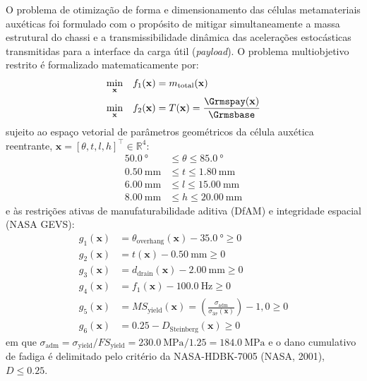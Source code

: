O problema de otimização de forma e dimensionamento das células metamateriais auxéticas foi formulado com o propósito de mitigar simultaneamente a massa estrutural do chassi e a transmissibilidade dinâmica das acelerações estocásticas transmitidas para a interface da carga útil (\textit{payload}). O problema multiobjetivo restrito é formalizado matematicamente por:
\begin{equation}
  \begin{aligned}
    \min_{\mathbf{x}} \quad & f_1(\mathbf{x}) = m_{\text{total}}(\mathbf{x}) \\
    \min_{\mathbf{x}} \quad & f_2(\mathbf{x}) = T(\mathbf{x}) = \frac{\Grmspay(\mathbf{x})}{\Grmsbase}
  \end{aligned}
  \label{eq:objetivos}
\end{equation}
sujeito ao espaço vetorial de parâmetros geométricos da célula auxética reentrante, $\mathbf{x} = [\theta, t, l, h]^{\top} \in \mathbb{R}^4$:
\begin{equation}
  \begin{aligned}
    \SI{50.0}{\degree} &\le \theta \le \SI{85.0}{\degree} \\
    \SI{0.50}{\milli\metre} &\le t \le \SI{1.80}{\milli\metre} \\
    \SI{6.00}{\milli\metre} &\le l \le \SI{15.00}{\milli\metre} \\
    \SI{8.00}{\milli\metre} &\le h \le \SI{20.00}{\milli\metre}
  \end{aligned}
  \label{eq:limites}
\end{equation}
e às restrições ativas de manufaturabilidade aditiva (DfAM) e integridade espacial (NASA GEVS):
\begin{equation}
  \begin{aligned}
    g_1(\mathbf{x}) &= \theta_{\text{overhang}}(\mathbf{x}) - \SI{35.0}{\degree} \ge 0 \\
    g_2(\mathbf{x}) &= t(\mathbf{x}) - \SI{0.50}{\milli\metre} \ge 0 \\
    g_3(\mathbf{x}) &= d_{\text{drain}}(\mathbf{x}) - \SI{2.00}{\milli\metre} \ge 0 \\
    g_4(\mathbf{x}) &= f_1(\mathbf{x}) - \SI{100.0}{\hertz} \ge 0 \\
    g_5(\mathbf{x}) &= MS_{\text{yield}}(\mathbf{x}) = \left( \frac{\sigma_{\text{adm}}}{\sigma_{3\sigma}(\mathbf{x})} \right) - 1{,}0 \ge 0 \\
    g_6(\mathbf{x}) &= \num{0.25} - D_{\text{Steinberg}}(\mathbf{x}) \ge 0
  \end{aligned}
  \label{eq:restricoes}
\end{equation}
em que $\sigma_{\text{adm}} = \sigma_{\text{yield}} / FS_{\text{yield}} = \SI{230.0}{\mega\pascal} / \num{1.25} = \SI{184.0}{\mega\pascal}$ e o dano cumulativo de fadiga é delimitado pelo critério da NASA-HDBK-7005 (NASA, 2001), $D \le \num{0.25}$.

